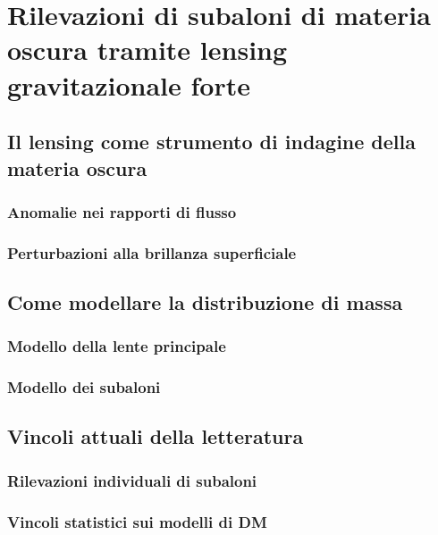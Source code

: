 \chapter{Rilevazioni di subaloni di materia oscura tramite lensing gravitazionale forte}
\label{cap:SGL+DM}


\section{Il lensing come strumento di indagine della materia oscura}
\subsection{Anomalie nei rapporti di flusso}
\subsection{Perturbazioni alla brillanza superficiale }
\section{Come modellare la distribuzione di massa}
\subsection{Modello della lente principale}
\subsection{Modello dei subaloni}
\section{Vincoli attuali della letteratura}
\subsection{Rilevazioni individuali di subaloni}
\subsection{Vincoli statistici sui modelli di DM}
